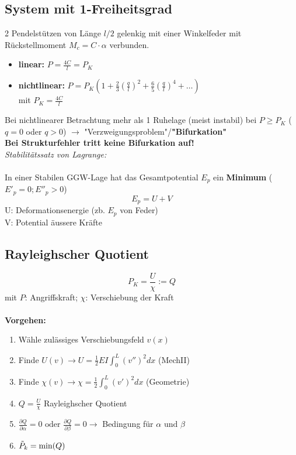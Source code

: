     \subsection{System mit 1-Freiheitsgrad}
        2 Pendelstützen von Länge $l/2$ gelenkig mit einer Winkelfeder mit Rückstellmoment $M_c=C\cdot\alpha$ verbunden.
        \begin{itemize}
            \item \textbf{linear:} $P=\frac{4C}{l}=P_K$
            \item \textbf{nichtlinear:} $P=P_K\left(1+\frac{2}{3}\left(\frac{q}{l}\right)^2+\frac{6}{5}\left(\frac{q}{l}\right)^4+\dots\right)$ \\mit $P_K=\frac{4C}{l}$
        \end{itemize}
        Bei nichtlinearer Betrachtung mehr als 1 Ruhelage (meist instabil) bei $P\geqslant P_K$ ($q=0$ oder $q >0$) $\rightarrow$ "Verzweigungsproblem"/\textbf{"Bifurkation"}
        \\\textbf{Bei Strukturfehler tritt keine Bifurkation auf!}
        \\\textit{Stabilitätssatz von Lagrange:}\\\\
        In einer Stabilen GGW-Lage hat das Gesamtpotential $E_p$ ein \textbf{Minimum} ($E'_p=0; E''_p>0$)
        \vspace{-2mm}\[E_p = U+V\]
        U: Deformationsenergie (zb. $E_p$ von Feder) 
        \\V: Potential äussere Kräfte
    \subsection{Rayleighscher Quotient}
        \[P_K=\frac{U}{\chi}:=Q\]
        mit $P$: Angriffskraft; \quad $\chi$: Verschiebung der Kraft\\\\
        \textbf{Vorgehen:}
        \begin{enumerate}
            \item Wähle zulässiges Verschiebungsfeld $v(x)$
            \item Finde $\displaystyle U(v) \rightarrow U = \frac{1}{2}EI\int_{0}^{L}(v'')^2dx$ \quad(MechII)
            \item Finde $\displaystyle \chi(v) \rightarrow \chi=\frac{1}{2}\int_{0}^{L}(v')^2dx$ \qquad(Geometrie)
            \item $Q=\frac{U}{\chi}$ Rayleighscher Quotient
            \item $\displaystyle\frac{\partial Q}{\partial\alpha}=0 \textrm{ oder } \frac{\partial Q}{\partial\beta}=0 \rightarrow$ Bedingung für $\alpha \textrm{ und } \beta$
            \item $\Tilde{P}_k=\textrm{min}(Q)$
            
        \end{enumerate}
        